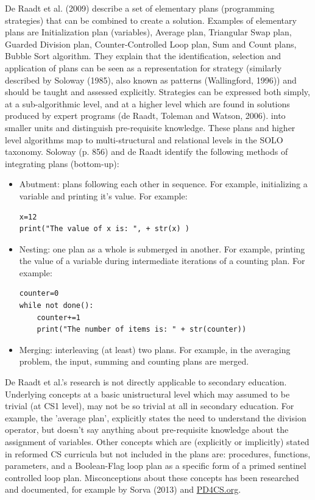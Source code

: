 De Raadt et al. (2009) describe a set of elementary plans (programming strategies) that can be combined to create a solution. Examples of elementary plans are Initialization plan (variables), Average plan, Triangular Swap plan, Guarded Division plan, Counter-Controlled Loop plan, Sum and Count plans, Bubble Sort algorithm. They explain that the identification, selection and application of plans can be seen as a representation for strategy (similarly described by Soloway (1985), also known as patterns (Wallingford, 1996)) and should be taught and assessed explicitly.
Strategies can be expressed both simply, at a sub-algorithmic level, and at a higher level which are found in solutions produced by expert programs (de Raadt, Toleman and Watson, 2006).  into  smaller units and distinguish pre-requisite knowledge. These plans and higher level algorithms map to multi-structural and relational levels in the SOLO taxonomy. Soloway (p. 856) and de Raadt identify the following methods of integrating plans (bottom-up):
\begin{itemize}
\item Abutment: plans following each other in sequence. For example, initializing a variable and printing it’s value. For example:
\begin{verbatim}
x=12
print("The value of x is: ", + str(x) )
\end{verbatim}

\item Nesting: one plan as a whole is submerged in another. For example, printing the value of a variable during intermediate iterations of a counting plan. For example:
\begin{verbatim}
counter=0
while not done():
    counter+=1
    print("The number of items is: " + str(counter))
\end{verbatim}

\item Merging: interleaving (at least) two plans. For example, in the averaging problem, the input, summing and counting plans are merged.
\end{itemize}

De Raadt et al.'s research is not directly applicable to secondary education. Underlying concepts at a basic unistructural level which may assumed to be trivial (at CS1 level), may not be so trivial at all in secondary education. For example, the 'average plan', explicitly states the need to understand the division operator, but doesn't say anything about pre-requisite knowledge about the assignment of variables. Other concepts which are (explicitly or implicitly) stated in reformed CS curricula but not included in the plans are: procedures, functions, parameters, and a Boolean-Flag loop plan as a specific form of a primed sentinel controlled loop plan. Misconceptions about these concepts has been researched and documented, for example by Sorva (2013) and \url{PD4CS.org}.




